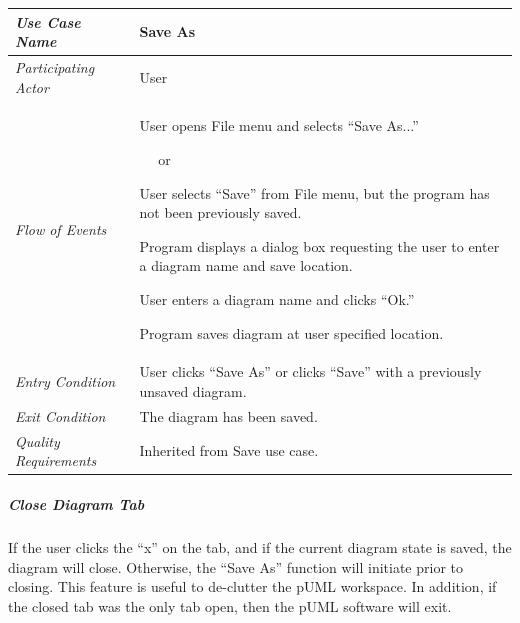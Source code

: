 \documentclass[twoside,letterpaper]{article}
\newenvironment{my_enumerate}{
\begin{enumerate}
  \setlength{\itemsep}{1pt}
  \setlength{\parskip}{0pt}
  \setlength{\parsep}{0pt}}{\end{enumerate}
}
\begin{document}
\begin{flushleft}
\tablehead{}
\begin{tabular}{|m{2.0in} m{5.0in}|}
\hline
{\bfseries\emph{Use Case Name}}
& {\bfseries Save As}
\\\hline
\emph{Participating Actor}
& User
\\\hline
\emph{Flow of Events}
& \begin{my_enumerate}
\item User opens File menu and selects ``Save As...''
\end{my_enumerate}
\ ~ or
\begin{my_enumerate}
\item User selects ``Save'' from File menu, but the program has not been previously saved.
\item Program displays a dialog box requesting the user to enter a diagram name and save location.
\item User enters a diagram name and clicks ``Ok.''
\item Program saves diagram at user specified location.
\end{my_enumerate}
\\\hline
\emph{Entry Condition}
& User clicks ``Save As'' or clicks ``Save'' with a previously unsaved diagram. 
\\\hline
\emph{Exit Condition}
& The diagram has been saved.
\\\hline
\emph{Quality Requirements}
& Inherited from Save use case. 
\\\hline
\end{tabular}
\end{flushleft}
\bigskip





\subparagraph[\ Close Diagram Tab ] 
{\bfseries Close Diagram Tab }
{ If the user clicks the ``x'' on the tab, and if the current diagram state is saved, the diagram will close. Otherwise, the ``Save As'' function will initiate prior to closing. This feature is useful to de-clutter the pUML workspace. In addition, if the closed tab was the only tab open, then the pUML software will exit.}
\end{document}
